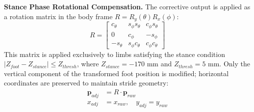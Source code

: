 \textbf{Stance Phase Rotational Compensation.}
The corrective output is applied as a rotation matrix in the
body frame $R = R_y(\theta) R_x(\phi)$:
\begin{equation}
    R = \begin{bmatrix}
    c_\theta & s_\phi s_\theta & c_\phi s_\theta \\
    0 & c_\phi & -s_\phi \\
    -s_\theta & s_\phi c_\theta & c_\phi c_\theta
    \end{bmatrix}
\end{equation}
This matrix is applied exclusively to limbs satisfying the
stance condition $|Z_{foot} - Z_{stance}| \leq Z_{thresh}$,
where $Z_{stance} = -170$ mm and $Z_{thresh} = 5$ mm. Only
the vertical component of the transformed foot position is
modified; horizontal coordinates are preserved to maintain
stride geometry:
\begin{align}
    \mathbf{p}_{adj} &= R \cdot \mathbf{p}_{raw} \\
    x_{adj} &= x_{raw}, \quad y_{adj} = y_{raw} \nonumber
\end{align}
